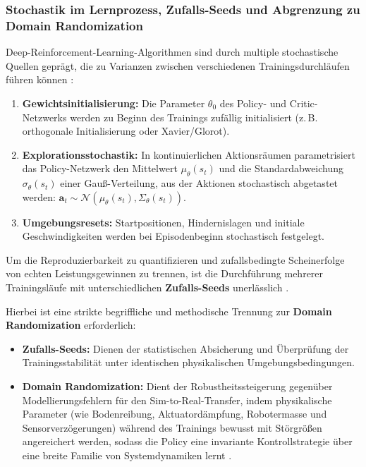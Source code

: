 \subsubsection{Stochastik im Lernprozess, Zufalls-Seeds und Abgrenzung zu Domain Randomization}
Deep-Reinforcement-Learning-Algorithmen sind durch multiple stochastische Quellen geprägt, die zu Varianzen zwischen verschiedenen Trainingsdurchläufen führen können \cite{hendersonDeepReinforcementLearning2019}:
\begin{enumerate}
	\item \textbf{Gewichtsinitialisierung:} Die Parameter $\theta_0$ des Policy- und Critic-Netzwerks werden zu Beginn des Trainings zufällig initialisiert (z.\,B. orthogonale Initialisierung oder Xavier/Glorot).
	\item \textbf{Explorationsstochastik:} In kontinuierlichen Aktionsräumen parametrisiert das Policy-Netzwerk den Mittelwert $\mu_\theta(s_t)$ und die Standardabweichung $\sigma_\theta(s_t)$ einer Gauß-Verteilung, aus der Aktionen stochastisch abgetastet werden: $\mathbf{a}_t \sim \mathcal{N}(\mu_\theta(s_t), \Sigma_\theta(s_t))$.
	\item \textbf{Umgebungsresets:} Startpositionen, Hindernislagen und initiale Geschwindigkeiten werden bei Episodenbeginn stochastisch festgelegt.
\end{enumerate}

Um die Reproduzierbarkeit zu quantifizieren und zufallsbedingte Scheinerfolge von echten Leistungsgewinnen zu trennen, ist die Durchführung mehrerer Trainingsläufe mit unterschiedlichen \textbf{Zufalls-Seeds} unerlässlich \cite{hendersonDeepReinforcementLearning2019}. 

Hierbei ist eine strikte begriffliche und methodische Trennung zur \textbf{Domain Randomization} erforderlich:
\begin{itemize}
	\item \textbf{Zufalls-Seeds:} Dienen der statistischen Absicherung und Überprüfung der Trainingsstabilität unter identischen physikalischen Umgebungsbedingungen.
	\item \textbf{Domain Randomization:} Dient der Robustheitssteigerung gegenüber Modellierungsfehlern für den Sim-to-Real-Transfer, indem physikalische Parameter (wie Bodenreibung, Aktuatordämpfung, Robotermasse und Sensorverzögerungen) während des Trainings bewusst mit Störgrößen angereichert werden, sodass die Policy eine invariante Kontrollstrategie über eine breite Familie von Systemdynamiken lernt \cite{hwangboLearningAgileDynamic2019, rudin2022learningwalkminutesusing}.
\end{itemize}

